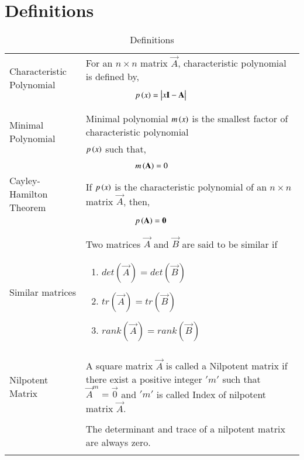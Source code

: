 \documentclass[journal,12pt]{IEEEtran}
\begin{document}
\section{\textbf{Definitions}}
\renewcommand{\thetable}{1}
\begin{table}[ht!]
\centering
\begin{tabular}{|p{5cm}|p{13cm}|}
    \hline
	\multirow{3}{*}{Characteristic Polynomial} 
	& For an $n\times n$ matrix $\vec{A}$, characteristic polynomial is defined by,\\
	&\\
	& $\qquad\qquad\qquad p\brak{x}=\mydet{x\Vec{I}-\Vec{A}}$\\
	&\\
	\hline
	\multirow{3}{*}{Minimal Polynomial} 
	&\\
	& Minimal polynomial $m\left(x\right)$ is the smallest factor of characteristic polynomial\\
	& $p\left(x\right)$ such that,\\
	&\\
	& $\qquad \qquad \qquad m\left(\mathbf{A}\right)=0$\\
    \hline
    \multirow{3}{*}{Cayley-Hamilton Theorem}
    &\\
    & If $p\left(x\right)$ is the characteristic polynomial of an $n\times n$ matrix $\vec{A}$, then,\\
    &\\
    &$\qquad \qquad \qquad p\left(\mathbf{A}\right)=\mathbf{0}$\\
    &\\
    \hline
    \multirow{3}{*}{Similar matrices}&\\
    &  Two   matrices $\vec{A}$ and $\vec{B}$ are said to be similar if\\
    &{\begin{enumerate}
        \item $det(\vec{A}) = det(\vec{B})$
        
        \item $tr (\vec{A}) = tr (\vec{B})$
       
        \item $rank(\vec{A})=rank(\vec{B})$
    \end{enumerate}}\\
    \hline
    \multirow{3}{*}{Nilpotent Matrix}&\\
    & A square matrix $\vec{A}$ is called a Nilpotent matrix if there exist a positive integer $'m'$ such that $\vec{A}^{m}=\vec{0}$ and $'m'$ is called Index of nilpotent matrix $\vec{A}$.\\
    &\\
   & The determinant and trace of a nilpotent matrix are always zero.\\
   &\\
    \hline
    
\end{tabular}
\label{table:1}
    \caption{Definitions}
\end{table}
\newpage
\end{document}
